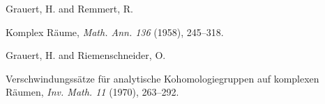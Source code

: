 {\par\vspace{2.15pt}\noindent \hypertarget{bib-475-18}{}Grauert, H. and Remmert, R.\par
\noindent\hangindent=25bp\hspace*{6bp}%
Komplex R\"aume, \emph{Math. Ann. 136} (1958), 245--318.\par
\par\vspace{2.15pt}\noindent \hypertarget{bib-475-19}{}Grauert, H. and Riemenschneider, O.\par
\noindent\hangindent=25bp\hspace*{6bp}%
Verschwindungss\"atze f\"ur analytische Kohomologiegruppen auf komplexen R\"aumen, \emph{Inv. Math. 11} (1970), 263--292.\par
}
